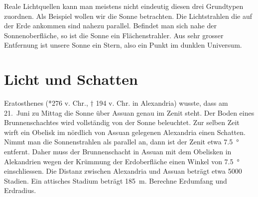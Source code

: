 \documentclass[12pt,a4paper,twoside]{article}
\begin{document}
\vspace*{3cm}

Reale Lichtquellen kann man meistens nicht eindeutig diesen drei Grundtypen zuordnen. Als Beispiel wollen wir die
Sonne betrachten. Die Lichtstrahlen die auf der Erde ankommen sind nahezu parallel. Befindet man sich nahe der
Sonnenoberfläche, so ist die Sonne ein Flächenstrahler. Aus sehr grosser Entfernung ist unsere Sonne ein Stern,
also ein Punkt im dunklen Universum.

\section{Licht und Schatten}

\newcommand{\Schirm}[3]{\draw [DS] (#1)--(#2) node [rotate=90, above right] {#3};}
\newcommand{\SchirmR}[0]{\Schirm{INO}{ISO}{Schirm}}




\begin{aufgabe}
Eratosthenes (*276 v. Chr., $\dagger$ 194 v. Chr. in Alexandria) wusste, dass
	am 21.\ Juni zu Mittag die Sonne über Assuan genau im Zenit steht.
	Der Boden eines Brunnenschachtes wird vollständig von der Sonne beleuchtet. 
 Zur selben Zeit wirft ein Obelisk im nördlich von Assuan gelegenen Alexandria einen Schatten.
 Nimmt man die Sonnenstrahlen als parallel an, dann ist der Zenit etwa \SI{7.5}{\degree} entfernt.
 Daher muss der Brunnenschacht in Assuan mit dem Obelisken in Alekandrien wegen der
 Krümmung der Erdoberfläche einen Winkel von \SI{7.5}{\degree} einschliessen.
 Die Distanz zwischen Alexandria und Assuan beträgt etwa 5000 Stadien. Ein
 attisches Stadium beträgt \SI{185}{m}. Berechne Erdumfang und Erdradius.
\end{aufgabe}
\end{document}
